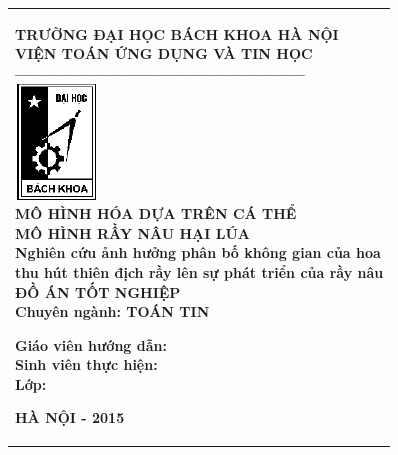 \documentclass[13pt]{extreport}
\begin{document}
\newcommand{\Khung}[2]{
\begin{tabular}{|l|}
\hline\rule[-2ex]{0pt}{5.5ex}
\parbox{#1}{#2}\\
\hline
\end{tabular}
}

\Khung{.92\textwidth}{

\begin{center}
\normalsize
\textbf{TRƯỜNG ĐẠI HỌC BÁCH KHOA HÀ NỘI}\\
\normalsize
\textbf{VIỆN TOÁN ỨNG DỤNG VÀ TIN HỌC}\\
\textbf{------------------------------------------------------}\\[0.4cm]
\includegraphics[scale=.8]{logobkdentrang}\\[1.2cm]
\textbf{{\large MÔ HÌNH HÓA DỰA TRÊN CÁ THỂ\\MÔ HÌNH RẦY NÂU HẠI LÚA}}\\[0.3cm]
\textbf{Nghiên cứu ảnh hưởng phân bố không gian của hoa\\thu hút thiên địch rầy lên sự phát triển của rầy nâu}\\[1cm]
\textbf{{\large ĐỒ ÁN TỐT NGHIỆP}}\\[0.2cm]
\textbf{{\large Chuyên ngành: TOÁN TIN}}\\[1cm]
\end{center}
\begin{flushleft}
\hspace{1.5cm} \textbf{ Giáo viên hướng dẫn:\hspace{0.2cm}{ TS. NGUYỄN THỊ NGỌC ANH }}\\[0.2cm]
\hspace{1.5cm} \textbf{ Sinh viên thực hiện:\hspace{0.5cm}{ VŨ THU THẢO}}\\[0.2cm]
\hspace{1.5cm} \textbf{ Lớp:\hspace{4.0cm}{ Toán Tin 2 - K55}}\\
\end{flushleft}

\vspace{1.3cm}
\begin{center}
\textbf{{\large HÀ NỘI - 2015}}\\
\end{center}
 }
\thispagestyle{empty}
\newpage
\end{document}
